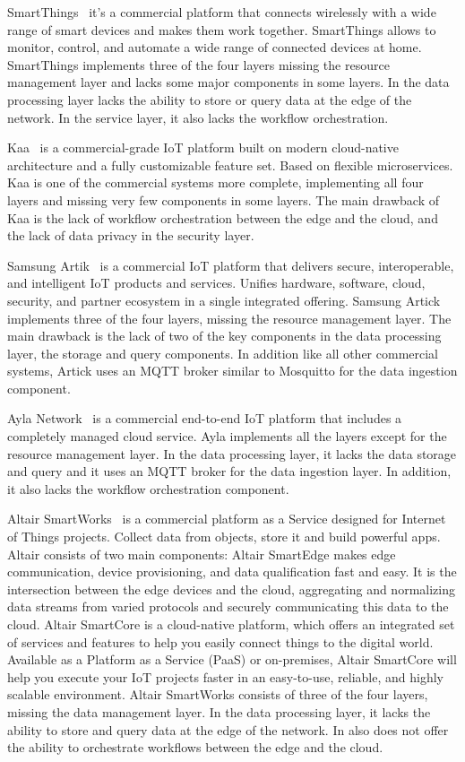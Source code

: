 SmartThings~\cite{SmartThings} it's a commercial platform that connects wirelessly with a wide range of smart devices and makes them work together. SmartThings allows to monitor, control, and automate a wide range of connected devices at home. SmartThings implements three of the four layers missing the resource management layer and lacks some major components in some layers. In the data processing layer lacks the ability to store or query data at the edge of the network. In the service layer, it also lacks the workflow orchestration.

Kaa~\cite{Kaa} is a commercial-grade IoT platform built on modern cloud-native architecture and a fully customizable feature set. Based on flexible microservices. Kaa is one of the commercial systems more complete, implementing all four layers and missing very few components in some layers.  The main drawback of Kaa is the lack of workflow orchestration between the edge and the cloud, and the lack of data privacy in the security layer.

Samsung Artik~\cite{Samsung_Artik} is a commercial IoT platform that delivers secure, interoperable, and intelligent IoT products and services. Unifies hardware, software, cloud, security, and partner ecosystem in a single integrated offering. Samsung Artick implements three of the four layers, missing the resource management layer.  The main drawback is the lack of two of the key components in the data processing layer, the storage and query components. In addition like all other commercial systems, Artick uses an MQTT broker similar to Mosquitto for the data ingestion component.

Ayla Network~\cite{Ayla_Networks} is a commercial end-to-end IoT platform that includes a completely managed cloud service. Ayla implements all the layers except for the resource management layer. In the data processing layer, it lacks the data storage and query and it uses an MQTT broker for the data ingestion layer. In addition, it also lacks the workflow orchestration component.

Altair SmartWorks~\cite{Altair_Smartworks} is a commercial platform as a Service designed for Internet of Things projects. Collect data from objects, store it and build powerful apps. Altair consists of two main components: Altair SmartEdge makes edge communication, device provisioning, and data qualification fast and easy. It is the intersection between the edge devices and the cloud, aggregating and normalizing data streams from varied protocols and securely communicating this data to the cloud.  Altair SmartCore is a cloud-native platform, which offers an integrated set of services and features to help you easily connect things to the digital world. Available as a Platform as a Service (PaaS) or on-premises, Altair SmartCore will help you execute your IoT projects faster in an easy-to-use, reliable, and highly scalable environment. Altair SmartWorks consists of three of the four layers, missing the data management layer. In the data processing layer, it lacks the ability to store and query data at the edge of the network. In also does not offer the ability to orchestrate workflows between the edge and the cloud.

